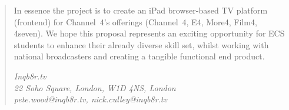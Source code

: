\begin{quotation}
In essence the project is to create an iPad browser-based TV platform (frontend) for Channel~4's offerings (Channel~4, E4, More4, Film4, 4seven). We hope this proposal represents an exciting opportunity for ECS students to enhance their already diverse skill set, whilst working with national broadcasters and creating a tangible functional end product.

\vspace{5 mm}
\begin{centering}
	\textit{Inqb8r.tv}\\
	\textit{22 Soho Square, London, W1D 4NS, London}\\
	\textit{pete.wood@inqb8r.tv, nick.culley@inqb8r.tv}\\
\end{centering}
\end{quotation}